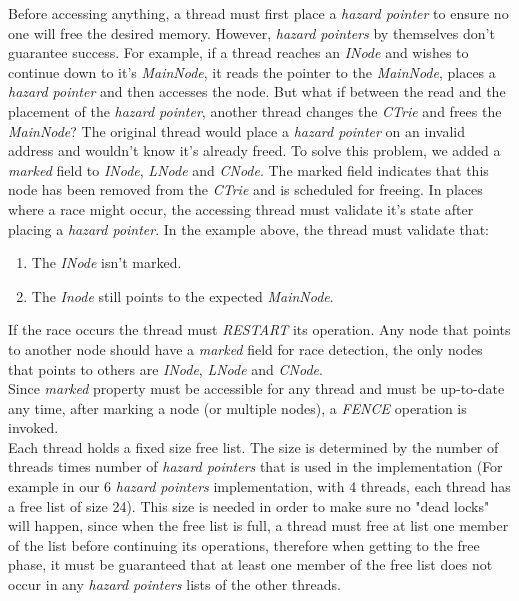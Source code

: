 \documentclass[conference]{IEEEtran}
\begin{document}
	Before accessing anything, a thread must first place a \textit{hazard pointer} to ensure no one will free the desired memory. However, \textit{hazard pointers} by themselves don't guarantee success. For example, if a thread reaches an \textit{INode} and wishes to continue down to it's \textit{MainNode}, it reads the pointer to the \textit{MainNode}, places a \textit{hazard pointer} and then accesses the node. But what if between the read and the placement of the \textit{hazard pointer}, another thread changes the \textit{CTrie} and frees the \textit{MainNode}? The original thread would place a \textit{hazard pointer} on an invalid address and wouldn't know it's already freed. To solve this problem, we added a \textit{marked} field to \textit{INode}, \textit{LNode} and \textit{CNode}. The marked field indicates that this node has been removed from the \textit{CTrie} and is scheduled for freeing. In places where a race might occur, the accessing thread must validate it's state after placing a \textit{hazard pointer}. In the example above, the thread must validate that:
	\begin{enumerate}
		\item The \textit{INode} isn't marked.
		\item The \textit{Inode} still points to the expected \textit{MainNode}.		
	\end{enumerate}
	If the race occurs the thread must \textit{RESTART} its operation. Any node that points to another node should have a \textit{marked} field for race detection, the only nodes that points to others are \textit{INode}, \textit{LNode} and \textit{CNode}. \\
	Since \textit{marked} property must be accessible for any thread and must be up-to-date any time, after marking a node (or multiple nodes), a \textit{FENCE} operation is invoked. \\
	Each thread holds a fixed size free list. The size is determined by the number of threads times number of \textit{hazard pointers} that is used in the implementation (For example in our 6 \textit{hazard pointers} implementation, with 4 threads, each thread has a free list of size 24). This size is needed in order to make sure no "dead locks" will happen, since when the free list is full, a thread must free at list one member of the list before continuing its operations, therefore when getting to the free phase, it must be guaranteed that at least one member of the free list does not occur in any \textit{hazard pointers} lists of the other threads.
	
\end{document}
